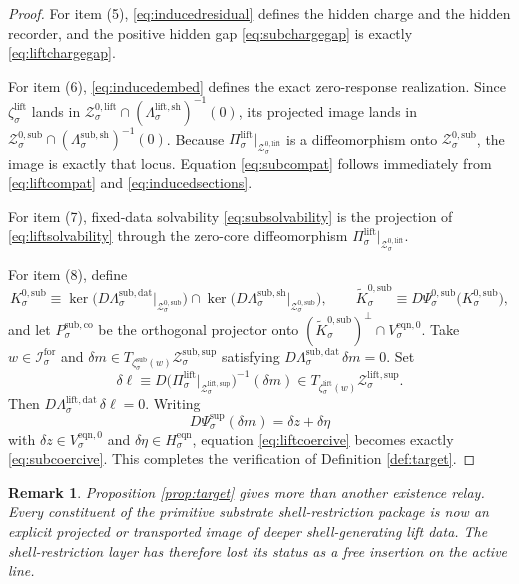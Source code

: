 \documentclass[11pt]{article}
\newcommand{\ForSpace}[1]{\mathcal I_{#1}^{\mathrm{for}}}
\newcommand{\EqnZero}[1]{V_{#1}^{\mathrm{eqn},0}}
\newcommand{\EqnHidden}[1]{H_{#1}^{\mathrm{eqn}}}
\newcommand{\SubData}[1]{\Lambda_{#1}^{\mathrm{sub,dat}}}
\newcommand{\SubShellMap}[1]{\Lambda_{#1}^{\mathrm{sub,sh}}}
\newcommand{\SubSupportShell}[1]{\mathcal Z_{#1}^{\mathrm{sub,sup}}}
\newcommand{\SubZeroCore}[1]{\mathcal Z_{#1}^{0,\mathrm{sub}}}
\newcommand{\ShellChart}[1]{\Psi_{#1}^{\mathrm{sup}}}
\newcommand{\SubZeroChart}[1]{\Psi_{#1}^{0,\mathrm{sub}}}
\newcommand{\SubEmbed}[1]{\zeta_{#1}^{\mathrm{sub}}}
\newcommand{\SubKernel}[1]{K_{#1}^{0,\mathrm{sub}}}
\newcommand{\SubKernelCh}[1]{\widetilde K_{#1}^{0,\mathrm{sub}}}
\newcommand{\SubStateComp}[1]{P_{#1}^{\mathrm{sub,co}}}
\newcommand{\LiftProj}[1]{\Pi_{#1}^{\mathrm{lift}}}
\newcommand{\LiftData}[1]{\Lambda_{#1}^{\mathrm{lift,dat}}}
\newcommand{\LiftShellMap}[1]{\Lambda_{#1}^{\mathrm{lift,sh}}}
\newcommand{\LiftSupportShell}[1]{\mathcal Z_{#1}^{\mathrm{lift,sup}}}
\newcommand{\LiftZeroCore}[1]{\mathcal Z_{#1}^{0,\mathrm{lift}}}
\newcommand{\LiftEmbed}[1]{\zeta_{#1}^{\mathrm{lift}}}
\newtheorem{remark}{Remark}
\begin{document}
\begin{proof}
For item (5), \eqref{eq:inducedresidual} defines the hidden charge and the hidden recorder, and the positive hidden gap \eqref{eq:subchargegap} is exactly \eqref{eq:liftchargegap}.

For item (6), \eqref{eq:inducedembed} defines the exact zero-response realization. Since \(\LiftEmbed{\sigma}\) lands in \(\LiftZeroCore{\sigma}\cap(\LiftShellMap{\sigma})^{-1}(0)\), its projected image lands in \(\SubZeroCore{\sigma}\cap(\SubShellMap{\sigma})^{-1}(0)\). Because \(\LiftProj{\sigma}\big|_{\LiftZeroCore{\sigma}}\) is a diffeomorphism onto \(\SubZeroCore{\sigma}\), the image is exactly that locus. Equation \eqref{eq:subcompat} follows immediately from \eqref{eq:liftcompat} and \eqref{eq:inducedsections}.

For item (7), fixed-data solvability \eqref{eq:subsolvability} is the projection of \eqref{eq:liftsolvability} through the zero-core diffeomorphism \(\LiftProj{\sigma}\big|_{\LiftZeroCore{\sigma}}\).

For item (8), define
\[
\SubKernel{\sigma}
\equiv
\ker\bigl(D\SubData{\sigma}\big|_{\SubZeroCore{\sigma}}\bigr)
\cap
\ker\bigl(D\SubShellMap{\sigma}\big|_{\SubZeroCore{\sigma}}\bigr),
\qquad
\SubKernelCh{\sigma}
\equiv
D\SubZeroChart{\sigma}\bigl(\SubKernel{\sigma}\bigr),
\]
and let \(\SubStateComp{\sigma}\) be the orthogonal projector onto \((\SubKernelCh{\sigma})^{\perp}\cap\EqnZero{\sigma}\). Take \(w\in\ForSpace{\sigma}\) and \(\delta m\in T_{\SubEmbed{\sigma}(w)}\SubSupportShell{\sigma}\) satisfying \(D\SubData{\sigma}\,\delta m=0\). Set
\[
\delta \ell
\equiv
D\bigl(\LiftProj{\sigma}\big|_{\LiftSupportShell{\sigma}}\bigr)^{-1}(\delta m)
\in
T_{\LiftEmbed{\sigma}(w)}\LiftSupportShell{\sigma}.
\]
Then \(D\LiftData{\sigma}\,\delta \ell=0\). Writing
\[
D\ShellChart{\sigma}(\delta m)=\delta z+\delta\eta
\]
with \(\delta z\in\EqnZero{\sigma}\) and \(\delta\eta\in\EqnHidden{\sigma}\), equation \eqref{eq:liftcoercive} becomes exactly \eqref{eq:subcoercive}. This completes the verification of Definition \ref{def:target}.
\end{proof}

\begin{remark}
Proposition \ref{prop:target} gives more than another existence relay. Every constituent of the primitive substrate shell-restriction package is now an explicit projected or transported image of deeper shell-generating lift data. The shell-restriction layer has therefore lost its status as a free insertion on the active line.
\end{remark}
\end{document}
